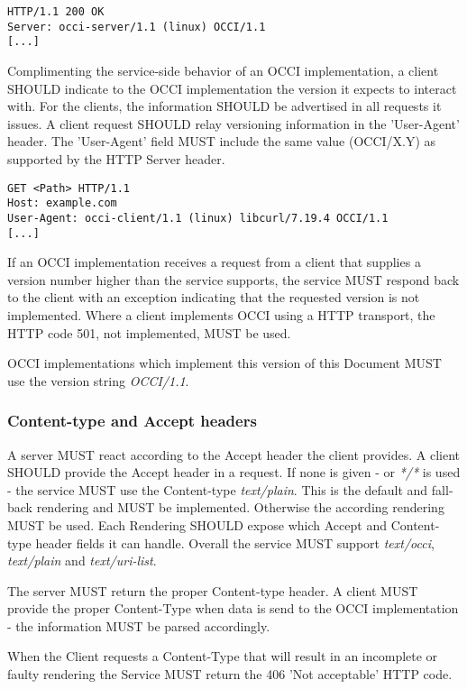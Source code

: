 \documentclass[10pt,a4paper]{article}
\begin{document}
\begin{verbatim}
HTTP/1.1 200 OK
Server: occi-server/1.1 (linux) OCCI/1.1
[...]
\end{verbatim}

Complimenting the service-side behavior of an OCCI implementation, a
client SHOULD indicate to the OCCI implementation the version
it expects to interact with. For the clients, the information SHOULD
be advertised in all requests it issues. A client request SHOULD relay
versioning information in the 'User-Agent' header. The 'User-Agent'
field MUST include the same value (OCCI/X.Y) as supported by the
HTTP Server header.

\begin{verbatim}
GET <Path> HTTP/1.1
Host: example.com
User-Agent: occi-client/1.1 (linux) libcurl/7.19.4 OCCI/1.1
[...]
\end{verbatim}

If an OCCI implementation receives a request from a client that
supplies a version number higher than the service supports, the
service MUST respond back to the client with an exception indicating
that the requested version is not implemented. Where a client
implements OCCI using a HTTP transport, the HTTP code 501, not
implemented, MUST be used.

OCCI implementations which implement this version of this Document MUST
use the version string \emph{OCCI/1.1}.

\subsubsection{Content-type and Accept headers}
\label{sec:content_type}
A server MUST react according to the Accept header the client
provides. A client SHOULD provide the Accept header in a request. If
none is given - or \textit{*/*} is used - the service MUST use the
Content-type \emph{text/plain}. This is the default and fall-back rendering and
MUST be implemented. Otherwise the according rendering MUST be
used. Each Rendering SHOULD expose which Accept and Content-type
header fields it can handle. Overall the service MUST support
\textit{text/occi}, \textit{text/plain} and \textit{text/uri-list}.

The server MUST return the proper Content-type header. A client MUST
provide the proper Content-Type when data is send to the OCCI
implementation - the information MUST be parsed accordingly.

When the Client requests a Content-Type that will result in an
incomplete or faulty rendering the Service MUST return the 406 'Not
acceptable' HTTP code.
\end{document}
